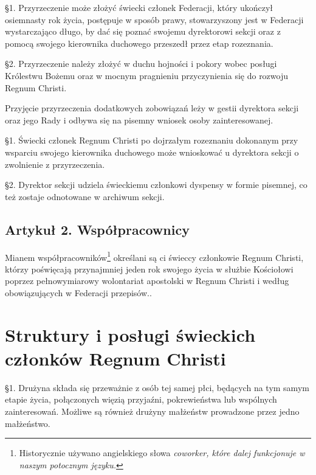 
 \S{}1. Przyrzeczenie może złożyć świecki członek Federacji, który ukończył osiemnasty rok życia, postępuje w sposób prawy, stowarzyszony jest w Federacji wystarczająco długo, by dać się poznać swojemu dyrektorowi sekcji oraz z pomocą swojego kierownika duchowego przeszedł przez etap rozeznania.

\S{}2. Przyrzeczenie należy złożyć w duchu hojności i pokory wobec posługi Królestwu Bożemu oraz w mocnym pragnieniu przyczynienia się do rozwoju Regnum Christi.


 Przyjęcie przyrzeczenia dodatkowych zobowiązań leży w gestii dyrektora sekcji oraz jego Rady i odbywa się na pisemny wniosek osoby zainteresowanej.


 \S{}1. Świecki członek Regnum Christi po dojrzałym rozeznaniu dokonanym przy wsparciu swojego kierownika duchowego może wnioskować u dyrektora sekcji o zwolnienie z przyrzeczenia.

\S{}2. Dyrektor sekcji udziela świeckiemu członkowi dyspensy w formie pisemnej, co też zostaje odnotowane w archiwum sekcji.

\filbreak


\section{Artykuł 2. Współpracownicy}


 Mianem współpracowników\footnote{Historycznie używano angielskiego słowa \em{coworker}, które dalej funkcjonuje w naszym potocznym języku.} określani są ci świeccy członkowie Regnum Christi, którzy poświęcają przynajmniej jeden rok swojego życia w służbie Kościołowi poprzez pełnowymiarowy wolontariat apostolski w Regnum Christi i według obowiązujących w Federacji przepisów..

\chapter{Struktury i posługi świeckich członków Regnum Christi}


 \S{}1. Drużyna składa się przeważnie z osób tej samej płci, będących na tym samym etapie życia, połączonych więzią przyjaźni, pokrewieństwa lub wspólnych zainteresowań. Możliwe są również drużyny małżeństw prowadzone przez jedno małżeństwo.

